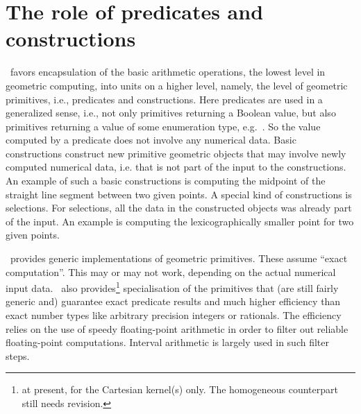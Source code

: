 \section{The role of predicates and constructions}
\cgal\ favors encapsulation of the basic arithmetic operations, the lowest
level in geometric computing, into units on a higher level, namely,
the level of geometric primitives, i.e., predicates and constructions. 
Here predicates are used in a generalized sense, i.e., not only primitives 
returning a Boolean value, but also primitives returning a value of 
some enumeration type, e.g.\ . So the value computed
by a predicate does not involve any numerical data. Basic constructions 
construct new primitive geometric objects that may involve newly computed
numerical data, i.e. that is not part of the input to the constructions. 
An example of such a basic constructions is computing the midpoint of
the straight line segment between two given points.
A special kind of constructions is selections. For selections, all the data
in the constructed objects was already part of the input. An example is
computing the lexicographically smaller point for two given points.

\cgal\ provides generic implementations of geometric primitives. These assume
``exact computation''. This may or may not work, depending on the actual
numerical input data. \cgal\ also provides\footnote{at present, for the 
Cartesian kernel(s) only. The homogeneous counterpart still needs revision.}
specialisation of the primitives
that (are still fairly generic and) guarantee exact predicate results and
much higher efficiency than exact number types like arbitrary precision
integers or rationals. The efficiency relies on the use of speedy 
floating-point arithmetic in order to filter out reliable floating-point 
computations. Interval arithmetic is largely used in such filter steps.

